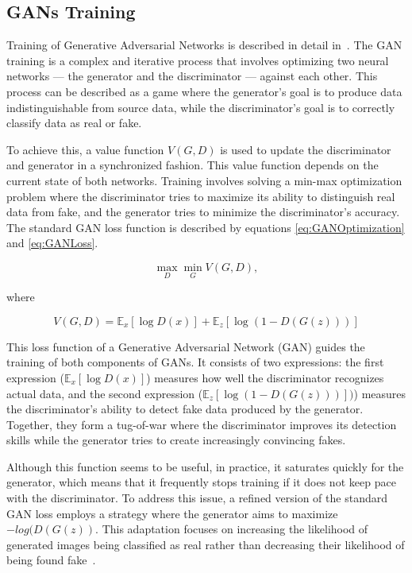 \subsection{GANs Training}
\label{ssec:GANsTraining}

Training of Generative Adversarial Networks is described in detail in~\cite{GANOverview}. The GAN training is a complex and iterative process that involves optimizing two neural networks — the generator and the discriminator — against each other. This process can be described as a game where the generator's goal is to produce data indistinguishable from source data, while the discriminator's goal is to correctly classify data as real or fake.

To achieve this, a value function $V(G,D)$ is used to update the discriminator and generator in a synchronized fashion. This value function depends on the current state of both networks. Training involves solving a min-max optimization problem where the discriminator tries to maximize its ability to distinguish real data from fake, and the generator tries to minimize the discriminator's accuracy. The standard GAN loss function is described by equations \ref{eq:GANOptimization} and \ref{eq:GANLoss}.
    
\begin{equation}
    \max_{D} \min_{G} V(G, D),
    \label{eq:GANOptimization}
\end{equation}

where

\begin{equation}
    V(G, D) = \mathbb{E}_{x}[\log D(x)] + \mathbb{E}_{z}[\log (1 - D(G(z)))]
    \label{eq:GANLoss}
\end{equation}

This loss function of a Generative Adversarial Network (GAN) guides the training of both components of GANs. It consists of two expressions: the first expression (\(\mathbb{E}_{x}[\log D(x)]\)) measures how well the discriminator recognizes actual data, and the second expression (\(\mathbb{E}_{z}[\log (1 - D(G(z)))])\)) measures the discriminator's ability to detect fake data produced by the generator. Together, they form a tug-of-war where the discriminator improves its detection skills while the generator tries to create increasingly convincing fakes. 

Although this function seems to be useful, in practice, it saturates quickly for the generator, which means that it frequently stops training if it does not keep pace with the discriminator. To address this issue, a refined version of the standard GAN loss employs a strategy where the generator aims to maximize $- log(D(G(z))$. This adaptation focuses on increasing the likelihood of generated images being classified as real rather than decreasing their likelihood of being found fake~\cite{GANEquations}.


